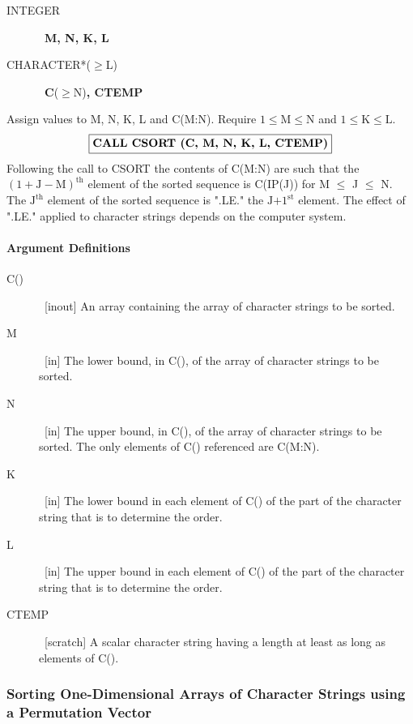 \documentclass[twoside]{MATH77}
\begin{document}
\begin{description}
\item[INTEGER]  \ {\bf M, N, K, L}

\item[CHARACTER*($\geq ${\rm L})]  \ {\bf C}($\geq $N){\bf , CTEMP}
\end{description}

Assign values to M, N, K, L and C(M:N). Require $1 \leq
\text{M} \leq \text{N}$ and $1 \leq \text{K} \leq \text{L}.$
$$
\fbox{\bf CALL CSORT (C, M, N, K, L, CTEMP)}
$$
Following the call to CSORT the contents of C(M:N) are such that
the $(1+\text{J}-\text{M})^{\text{th}}$ element of the sorted
sequence is C(IP(J)) for M $\leq $ J $\leq $ N. The
$\text{J}^{\text{th}}$ element of the sorted sequence is ".LE." the
$\text{J+1}^{\text{st}}$ element.  The effect of ".LE." applied to
character strings depends on the computer system.

\paragraph{Argument Definitions}

\begin{description}
\item[C()]  \ [inout] An array containing the array of character strings to
be sorted.

\item[M]  \ [in] The lower bound, in C(), of the array of character strings
to be sorted.

\item[N]  \ [in] The upper bound, in C(), of the array of character strings
to be sorted. The only elements of C() referenced are C(M:N).

\item[K]  \ [in] The lower bound in each element of C() of the part of the
character string that is to determine the order.

\item[L]  \ [in] The upper bound in each element of C() of the part of the
character string that is to determine the order.

\item[CTEMP]  \ [scratch] A scalar character string having a length at least as
long as elements of C().
\end{description}

\subsubsection{Sorting One-Dimensional Arrays of Character Strings using a
Permutation Vector}
\end{document}
